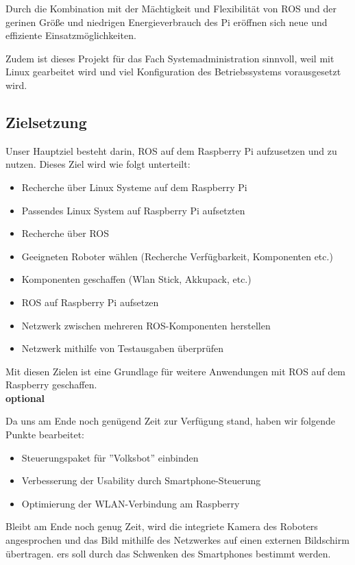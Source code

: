 \documentclass[12pt]{article}
\begin{document}
Durch die Kombination mit der Mächtigkeit und Flexibilität von ROS und der gerinen Größe und niedrigen Energieverbrauch des Pi eröffnen sich neue und effiziente Einsatzmöglichkeiten.

Zudem ist dieses Projekt für das Fach Systemadministration sinnvoll, weil mit Linux gearbeitet wird und viel Konfiguration des Betriebssystems vorausgesetzt wird.

\subsection{Zielsetzung}


Unser Hauptziel besteht darin, ROS auf dem Raspberry Pi aufzusetzen und zu nutzen. Dieses Ziel wird wie folgt unterteilt:\\

\begin{itemize}

\item Recherche über Linux Systeme auf dem Raspberry Pi 
\item Passendes Linux System auf Raspberry Pi aufsetzten			
\item Recherche über ROS
\item Geeigneten Roboter wählen (Recherche Verfügbarkeit, Komponenten etc.)
\item Komponenten geschaffen (Wlan Stick, Akkupack, etc.)
\item ROS auf Raspberry Pi aufsetzen
\item Netzwerk zwischen mehreren ROS-Komponenten herstellen
\item Netzwerk mithilfe von Testausgaben überprüfen

\end{itemize}

Mit diesen Zielen ist eine Grundlage für weitere Anwendungen mit ROS auf dem Raspberry geschaffen.\\

{\bf optional}

Da uns am Ende noch genügend Zeit zur Verfügung stand, haben wir folgende Punkte bearbeitet:

\begin{itemize}

\item Steuerungspaket für ''Volksbot'' einbinden
\item Verbesserung der Usability durch Smartphone-Steuerung
\item Optimierung der WLAN-Verbindung am Raspberry
 
\end{itemize}
Bleibt am Ende noch genug Zeit, wird die integriete Kamera des Roboters angesprochen und das Bild mithilfe des Netzwerkes auf einen externen Bildschirm übertragen.
ers soll durch das Schwenken des Smartphones bestimmt werden.
\end{document}
